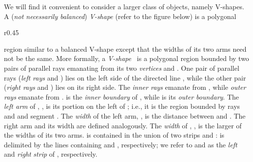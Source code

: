 \documentclass{llncs}
\begin{document}
We will find it convenient to consider a larger class of objects,
namely V-shapes. A (\emph{not necessarily balanced}) \emph{V-shape} (refer to the
figure below) is a polygonal
\begin{wrapfigure}[9]{r}{0.45\textwidth}
\end{wrapfigure}
region similar to a balanced V-shape except that the widths of its two
arms need not be the same.  More formally, a \emph{V-shape}~ is a
polygonal region bounded by two pairs of parallel rays emanating from
its two \emph{vertices}  and .  One pair of parallel rays
(\emph{left rays}  and ) lies on the left side of the
directed line , while the other pair (\emph{right rays}  and
) lies on its right side.  The \emph{inner rays}  emanate
from , while \emph{outer rays}  emanate from .   is the \emph{inner boundary} of , while  is its
\emph{outer boundary}.  The \emph{left arm} of , , is its
portion on the left of ; i.e., it is the region bounded by rays
 and  and segment .  The \emph{width} of the left arm,
, is the distance between  and .  The right
arm and its width are defined analogously.  The \emph{width} of ,
, is the larger of the widths of its two arms.   is
contained in the union of two strips  and :  is
delimited by the lines containing  and , respectively; we
refer to  and  as the \emph{left} and \emph{right}
\emph{strip} of , respectively.
\end{document}
